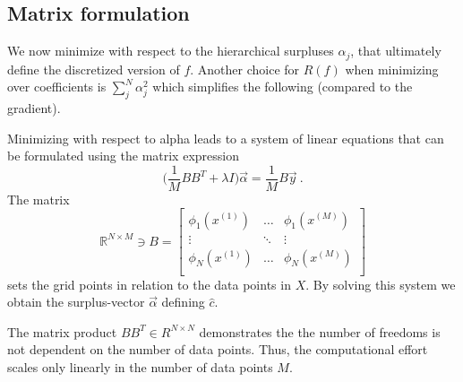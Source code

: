 \subsection{Matrix formulation}
We now minimize with respect to the hierarchical surpluses $\alpha_j$,
that ultimately define the discretized version of $f$.
Another choice for $R(f)$ when minimizing over coefficients is
$\sum_j^N{\alpha_j^2}$ which simplifies the following (compared to the gradient).
\par
Minimizing with respect to alpha leads to a system of linear equations that
can be formulated using the matrix expression
$$\Big(\frac{1}{M} BB^T + \lambda I \Big)\vec{\alpha} = \frac{1}{M}B\vec{y} \
.$$
The matrix
$$ \mathbb{R}^{N \times M} \ni B =
\begin{bmatrix}
  \phi_1(x^{(1)}) & \dots & \phi_1(x^{(M)}) \\
  \vdots & \ddots & \vdots \\
  \phi_N(x^{(1)}) & \dots  & \phi_N(x^{(M)}) \\
\end{bmatrix}
$$
sets the grid points in relation to the data points in $X$. By solving this
system we obtain the surplus-vector $\vec{\alpha}$ defining $\hat{c}$.

The
matrix product $BB^T \in R^{N \times N}$ demonstrates the the number of freedoms
is not dependent on the number of data points. Thus, the computational effort
scales only linearly in the number of data points $M$. \\

